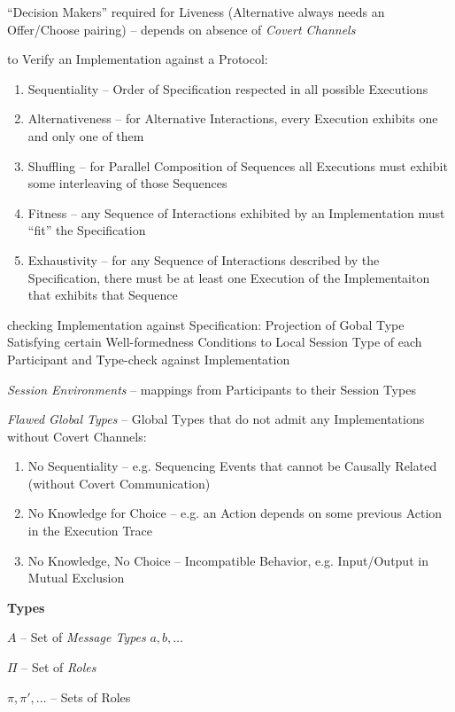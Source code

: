 ``Decision Makers'' required for Liveness (Alternative always needs an
Offer/Choose pairing) -- depends on absence of \emph{Covert Channels}

to Verify an Implementation against a Protocol:

\begin{enumerate}
  \item Sequentiality -- Order of Specification respected in all
    possible Executions
  \item Alternativeness -- for Alternative Interactions, every
    Execution exhibits one and only one of them
  \item Shuffling -- for Parallel Composition of Sequences all
    Executions must exhibit some interleaving of those Sequences
  \item Fitness -- any Sequence of Interactions exhibited by an
    Implementation must ``fit'' the Specification
  \item Exhaustivity -- for any Sequence of Interactions described by
    the Specification, there must be at least one Execution of the
    Implementaiton that exhibits that Sequence
\end{enumerate}

checking Implementation against Specification: Projection of Gobal
Type Satisfying certain Well-formedness Conditions to Local Session
Type of each Participant and Type-check against Implementation

\emph{Session Environments} -- mappings from Participants to their
Session Types

\emph{Flawed Global Types} -- Global Types that do not admit any
Implementations without Covert Channels:

\begin{enumerate}
  \item No Sequentiality -- e.g. Sequencing Events that cannot be
    Causally Related (without Covert Communication)
  \item No Knowledge for Choice -- e.g. an Action depends on some
    previous Action in the Execution Trace
  \item No Knowledge, No Choice -- Incompatible Behavior, e.g.
    Input/Output in Mutual Exclusion %
\end{enumerate}


\textbf{Types}

$A$ -- Set of \emph{Message Types} $a, b, \ldots$

$\Pi$ -- Set of \emph{Roles}

$\pi, \pi', \ldots$ -- Sets of Roles

